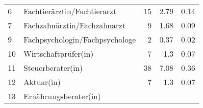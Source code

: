\begin{longtable}{lXrrr}
     6 &
     \multicolumn{1}{X}{ Fachtierärztin/Fachtierarzt   } &


       \num{15} &
       \num[round-mode=places,round-precision=2]{2,79} &
         \num[round-mode=places,round-precision=2]{0,14} \\

     7 &
     \multicolumn{1}{X}{ Fachzahnärztin/Fachzahnarzt   } &


       \num{9} &
       \num[round-mode=places,round-precision=2]{1,68} &
         \num[round-mode=places,round-precision=2]{0,09} \\

     9 &
     \multicolumn{1}{X}{ Fachpsychologin/Fachpsychologe   } &


       \num{2} &
       \num[round-mode=places,round-precision=2]{0,37} &
         \num[round-mode=places,round-precision=2]{0,02} \\

     10 &
     \multicolumn{1}{X}{ Wirtschaftprüfer(in)   } &


       \num{7} &
       \num[round-mode=places,round-precision=2]{1,3} &
         \num[round-mode=places,round-precision=2]{0,07} \\

     11 &
     \multicolumn{1}{X}{ Steuerberater(in)   } &


       \num{38} &
       \num[round-mode=places,round-precision=2]{7,08} &
         \num[round-mode=places,round-precision=2]{0,36} \\

     12 &
     \multicolumn{1}{X}{ Aktuar(in)   } &


       \num{7} &
       \num[round-mode=places,round-precision=2]{1,3} &
         \num[round-mode=places,round-precision=2]{0,07} \\

     13 &
     \multicolumn{1}{X}{ Ernährungsberater(in)   } &



\end{longtable}
